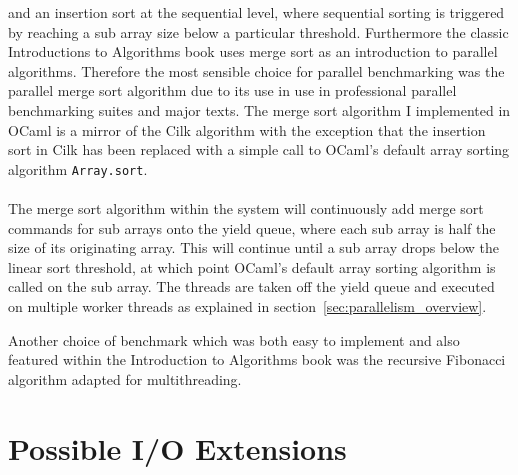 \documentclass[12pt,twoside,notitlepage]{report}
\begin{document}
and an insertion sort at the sequential level, where sequential sorting is triggered by reaching a sub array size below a particular threshold. Furthermore the classic Introductions to Algorithms book \cite{cormen2009} uses merge sort
as an introduction to parallel algorithms. Therefore the most sensible choice for parallel benchmarking was the parallel merge sort algorithm due to its use in use in professional parallel benchmarking suites and major texts. The merge sort algorithm
I implemented in OCaml is a mirror of the Cilk algorithm with the exception that the insertion sort in Cilk has been replaced with a simple call to OCaml's default array sorting algorithm {\tt Array.sort}.
\hfill\\
\hfill\\
The merge sort algorithm within the system will continuously add merge sort commands for sub arrays onto the yield queue, where each sub array is half the size of its originating array. This will continue until a sub array
drops below the linear sort threshold, at which point OCaml's default array sorting algorithm is called on the sub array. The threads are taken off the yield queue and executed on multiple worker threads as explained in
section~\ref{sec:parallelism_overview}.

%
%
Another choice of benchmark which was both easy to implement and also featured within the Introduction to Algorithms book was the recursive Fibonacci algorithm adapted for multithreading.

%
%

\section{Possible I/O Extensions}
\label{sec:possible_io_extensions}
%
%

%
%
\end{document}
